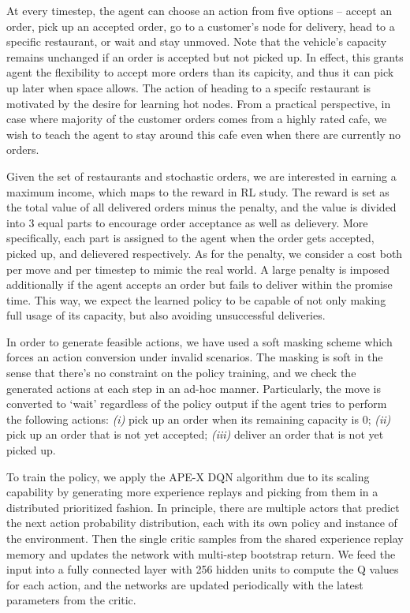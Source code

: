 \documentclass{article}
\begin{document}
At every timestep, the agent can choose an action from five options -- accept an order, pick up an accepted order, go to a customer's node for delivery, head to a specific restaurant, or wait and stay unmoved. Note that the vehicle's capacity remains unchanged if an order is accepted but not picked up. In effect, this grants agent the flexibility to accept more orders than its capicity, and thus it can pick up later when space allows. The action of heading to a specifc restaurant is motivated by the desire for learning hot nodes. From a practical perspective, in case where majority of the customer orders comes from a highly rated cafe, we wish to teach the agent to stay around this cafe even when there are currently no orders.

Given the set of restaurants and stochastic orders, we are interested in earning a maximum income, which maps to the reward in RL study. The reward is set as the total value of all delivered orders minus the penalty, and the value is divided into $3$ equal parts to encourage order acceptance as well as delievery. More specifically, each part is assigned to the agent when the order gets accepted, picked up, and delievered respectively.  As for the penalty, we consider a cost both per move and per timestep to mimic the real world. A large penalty is imposed additionally if the agent accepts an order but fails to deliver within the promise time. This way, we expect the learned policy to be capable of not only making full usage of its capacity, but also avoiding unsuccessful deliveries. 

In order to generate feasible actions, we have used a soft masking scheme which forces an action conversion under invalid scenarios. The masking is soft in the sense that there's no constraint on the policy training, and we check the generated actions at each step in an ad-hoc manner. Particularly, the move is converted to `wait' regardless of the policy output if the agent tries to perform the following actions: \textit{(i)} pick up an order when its remaining capacity is $0$; \textit{(ii)} pick up an order that is not yet accepted; \textit{(iii)} deliver an order that is not yet picked up. 

To train the policy, we apply the APE-X \cite{horgan2018distributed} DQN \cite{mnih2013playing} algorithm due to its scaling capability by generating more experience replays and picking from them in a distributed prioritized fashion. In principle, there are multiple actors that predict the next action probability distribution, each with its own policy and instance of the environment. Then the single critic samples from the shared experience replay memory and updates the network with multi-step bootstrap return. We feed the input into a fully connected layer with 256 hidden units to compute the Q values for each action, and the networks are updated periodically with the latest parameters from the critic.  
\end{document}
